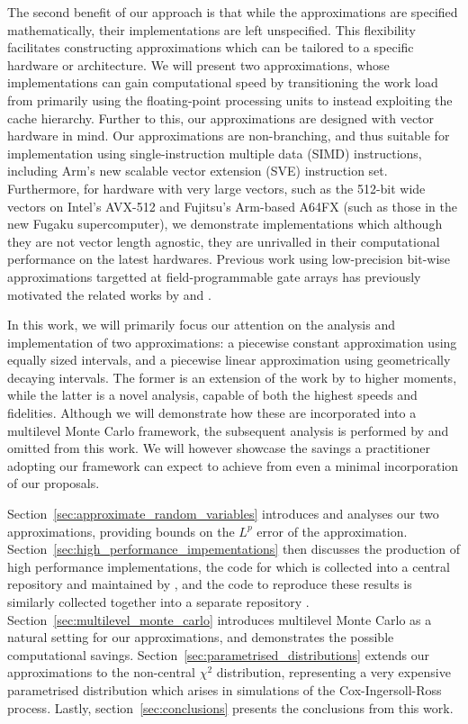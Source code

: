 \documentclass[manuscript]{acmart}
\begin{document}
The second benefit of our approach is that while the approximations are  specified mathematically, their implementations are left unspecified. This flexibility facilitates constructing approximations which can be tailored to a specific hardware or architecture. We will present two approximations, whose implementations can gain computational speed by transitioning the work load from primarily using the floating-point processing units to instead exploiting the cache hierarchy. Further to this, our approximations are designed with vector hardware in mind. Our approximations are non-branching, and thus suitable for implementation using single-instruction multiple data (SIMD) instructions, including Arm's new scalable vector extension (SVE) instruction set. Furthermore, for hardware with very large vectors, such as the 512-bit wide vectors on Intel's AVX-512 and Fujitsu's Arm-based A64FX (such as those in the new Fugaku supercomputer), we demonstrate implementations which although they are not vector length agnostic, they are unrivalled in their computational performance on the latest hardwares. Previous work using low-precision bit-wise approximations targetted at field-programmable gate arrays has previously motivated the related works by \citet{brugger2014mixed} and \citet{omland2015exploiting}.

In this work, we will primarily focus our attention on the analysis and implementation of two approximations: a piecewise constant approximation using equally sized intervals, and a piecewise linear approximation using geometrically decaying intervals. The former is an extension of the work by \citet[Theorem~1]{giles2019random_quadrature} to higher moments, while the latter is a novel analysis, capable of both the highest speeds and fidelities. Although we will demonstrate how these are incorporated into a multilevel Monte Carlo framework, the subsequent analysis is performed by \citeauthor{giles2020approximate} \citep{giles2020approximate,sheridan2020nested} and omitted from this work. We will however showcase the savings a practitioner adopting our framework can expect to achieve from even a minimal incorporation of our proposals. 

Section~\ref{sec:approximate_random_variables} introduces and analyses our two approximations, providing bounds on the $ L^p $ error of the approximation. Section~\ref{sec:high_performance_impementations} then discusses the production of high performance implementations, the code for which is collected into a central repository and maintained by \citet{sheridan2020approximate_random,sheridan2020approximate_inverse}, and the code to reproduce these results is similarly collected together into a separate repository \citep{sheridan2020approximate_inverse}. Section~\ref{sec:multilevel_monte_carlo} introduces multilevel Monte Carlo as a natural setting for our approximations, and demonstrates the possible computational savings. Section~\ref{sec:parametrised_distributions} extends our approximations to the non-central $ \chi^2 $ distribution, representing a very expensive parametrised distribution which arises in simulations of the Cox-Ingersoll-Ross process. Lastly, section~\ref{sec:conclusions} presents the conclusions from this work. 
\end{document}
